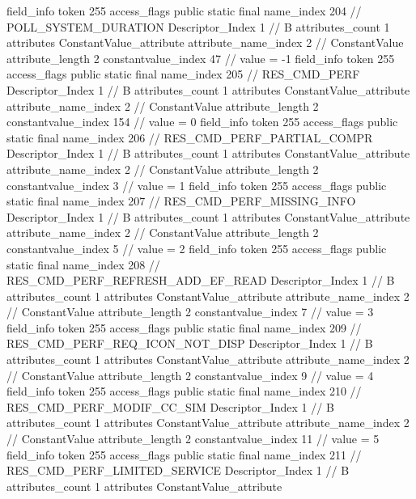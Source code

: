 {{{{			field_info {
				token	255
				access_flags	public static final
				name_index	204		// POLL_SYSTEM_DURATION
				Descriptor_Index	1		// B
				attributes_count	1
				attributes {
				ConstantValue_attribute {
					attribute_name_index	2		// ConstantValue
					attribute_length	2
					constantvalue_index	47		// value = -1
				}
				}
			}
			field_info {
				token	255
				access_flags	public static final
				name_index	205		// RES_CMD_PERF
				Descriptor_Index	1		// B
				attributes_count	1
				attributes {
				ConstantValue_attribute {
					attribute_name_index	2		// ConstantValue
					attribute_length	2
					constantvalue_index	154		// value = 0
				}
				}
			}
			field_info {
				token	255
				access_flags	public static final
				name_index	206		// RES_CMD_PERF_PARTIAL_COMPR
				Descriptor_Index	1		// B
				attributes_count	1
				attributes {
				ConstantValue_attribute {
					attribute_name_index	2		// ConstantValue
					attribute_length	2
					constantvalue_index	3		// value = 1
				}
				}
			}
			field_info {
				token	255
				access_flags	public static final
				name_index	207		// RES_CMD_PERF_MISSING_INFO
				Descriptor_Index	1		// B
				attributes_count	1
				attributes {
				ConstantValue_attribute {
					attribute_name_index	2		// ConstantValue
					attribute_length	2
					constantvalue_index	5		// value = 2
				}
				}
			}
			field_info {
				token	255
				access_flags	public static final
				name_index	208		// RES_CMD_PERF_REFRESH_ADD_EF_READ
				Descriptor_Index	1		// B
				attributes_count	1
				attributes {
				ConstantValue_attribute {
					attribute_name_index	2		// ConstantValue
					attribute_length	2
					constantvalue_index	7		// value = 3
				}
				}
			}
			field_info {
				token	255
				access_flags	public static final
				name_index	209		// RES_CMD_PERF_REQ_ICON_NOT_DISP
				Descriptor_Index	1		// B
				attributes_count	1
				attributes {
				ConstantValue_attribute {
					attribute_name_index	2		// ConstantValue
					attribute_length	2
					constantvalue_index	9		// value = 4
				}
				}
			}
			field_info {
				token	255
				access_flags	public static final
				name_index	210		// RES_CMD_PERF_MODIF_CC_SIM
				Descriptor_Index	1		// B
				attributes_count	1
				attributes {
				ConstantValue_attribute {
					attribute_name_index	2		// ConstantValue
					attribute_length	2
					constantvalue_index	11		// value = 5
				}
				}
			}
			field_info {
				token	255
				access_flags	public static final
				name_index	211		// RES_CMD_PERF_LIMITED_SERVICE
				Descriptor_Index	1		// B
				attributes_count	1
				attributes {
				ConstantValue_attribute {
}}}}}}}
